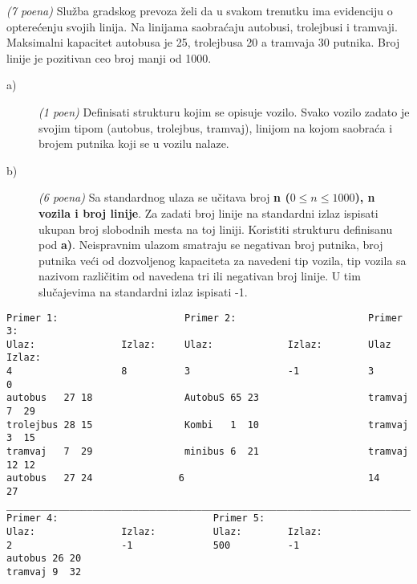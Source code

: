 \begin{Exercise}[label=v1.3_01] 
{\em (7 poena)} Služba gradskog prevoza želi da u svakom trenutku ima
evidenciju o opterećenju svojih linija. Na linijama saobraćaju
autobusi, trolejbusi i tramvaji. Maksimalni kapacitet autobusa je 25,
trolejbusa 20 a tramvaja 30 putnika. Broj linije je pozitivan ceo broj
manji od 1000.
\begin{description}
\item[a)] {\em (1 poen)}  Definisati strukturu kojim se opisuje vozilo. Svako vozilo zadato je svojim tipom (autobus, trolejbus, tramvaj), linijom na kojom saobraća i
   brojem putnika koji se u vozilu nalaze.
\item[b)] {\em (6 poena)}  Sa standardnog ulaza se učitava
   broj \textbf{n ($0 \le n \le 1000$), n vozila i broj linije}. Za
   zadati broj linije na standardni izlaz ispisati ukupan broj
   slobodnih mesta na toj liniji. Koristiti strukturu definisanu pod
   {\bf a)}. Neispravnim ulazom smatraju se negativan broj putnika,
   broj putnika veći od dozvoljenog kapaciteta za navedeni tip vozila,
   tip vozila sa nazivom različitim od navedena tri ili negativan broj
   linije. U tim slučajevima na standardni izlaz ispisati -1.
\end{description}
\begin{small}
\begin{center}
\begin{verbatim}
Primer 1:                      Primer 2:                       Primer 3:             
Ulaz:               Izlaz:     Ulaz:             Izlaz:        Ulaz              Izlaz:
4                   8          3                 -1            3                 0
autobus   27 18                AutobuS 65 23                   tramvaj 7  29
trolejbus 28 15                Kombi   1  10                   tramvaj 3  15
tramvaj   7  29                minibus 6  21                   tramvaj 12 12
autobus   27 24               6                                14
27
_________________________________________________________________________________________
Primer 4:                           Primer 5:
Ulaz:               Izlaz:          Ulaz:        Izlaz:
2                   -1              500          -1
autobus 26 20  
tramvaj 9  32
\end{verbatim}
\end{center}
\end{small}
\end{Exercise}
\begin{Answer}[ref=v1.3_01]
\end{Answer}





